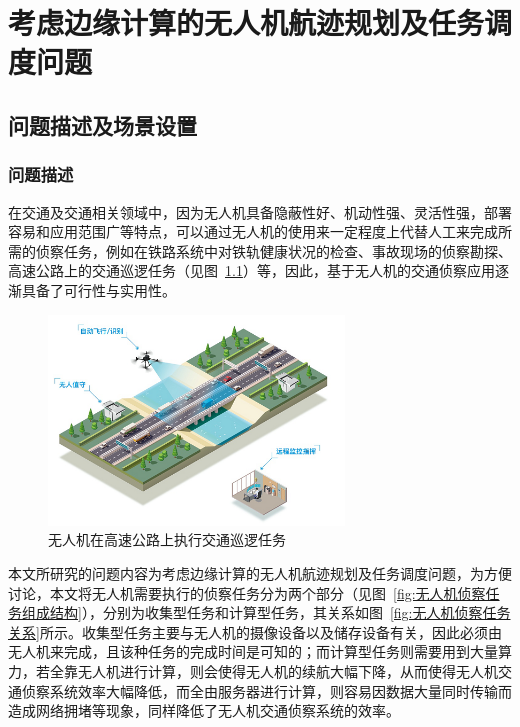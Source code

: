 \chapter{考虑边缘计算的无人机航迹规划及任务调度问题}

\section{问题描述及场景设置} \label{sec:description}

\subsection{问题描述}

在交通及交通相关领域中，因为无人机具备隐蔽性好、机动性强、灵活性强，部署容易和应用范围广等特点，可以通过无人机的使用来一定程度上代替人工来完成所需的侦察任务，例如在铁路系统中对铁轨健康状况的检查、事故现场的侦察勘探、高速公路上的交通巡逻任务（见图~\ref{fig:无人机在高速公路上执行交通巡逻任务}）等，因此，基于无人机的交通侦察应用逐渐具备了可行性与实用性。

\begin{figure}[!htbp]
    \centering
    \includegraphics[width=0.7\textwidth]{images/无人机交通侦察应用场景.png}
    \caption{无人机在高速公路上执行交通巡逻任务}
    \label{fig:无人机在高速公路上执行交通巡逻任务}
\end{figure}

本文所研究的问题内容为考虑边缘计算的无人机航迹规划及任务调度问题，为方便讨论，本文将无人机需要执行的侦察任务分为两个部分（见图~\ref{fig:无人机侦察任务组成结构}），分别为收集型任务和计算型任务，其关系如图~\ref{fig:无人机侦察任务关系}所示。收集型任务主要与无人机的摄像设备以及储存设备有关，因此必须由无人机来完成，且该种任务的完成时间是可知的；而计算型任务则需要用到大量算力，若全靠无人机进行计算，则会使得无人机的续航大幅下降，从而使得无人机交通侦察系统效率大幅降低，而全由服务器进行计算，则容易因数据大量同时传输而造成网络拥堵等现象，同样降低了无人机交通侦察系统的效率。

